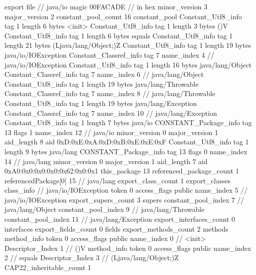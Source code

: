 export file {		// java/io
	magic	00FACADE		 // in hex
	minor_version	3
	major_version	2
	constant_pool_count	16
	constant_pool {
		Constant_Utf8_info {
			tag	1
			length	6
			bytes	<init>
		}
		Constant_Utf8_info {
			tag	1
			length	3
			bytes	()V
		}
		Constant_Utf8_info {
			tag	1
			length	6
			bytes	equals
		}
		Constant_Utf8_info {
			tag	1
			length	21
			bytes	(Ljava/lang/Object;)Z
		}
		Constant_Utf8_info {
			tag	1
			length	19
			bytes	java/io/IOException
		}
		Constant_Classref_info {
			tag	7
			name_index	4		// java/io/IOException
		}
		Constant_Utf8_info {
			tag	1
			length	16
			bytes	java/lang/Object
		}
		Constant_Classref_info {
			tag	7
			name_index	6		// java/lang/Object
		}
		Constant_Utf8_info {
			tag	1
			length	19
			bytes	java/lang/Throwable
		}
		Constant_Classref_info {
			tag	7
			name_index	8		// java/lang/Throwable
		}
		Constant_Utf8_info {
			tag	1
			length	19
			bytes	java/lang/Exception
		}
		Constant_Classref_info {
			tag	7
			name_index	10		// java/lang/Exception
		}
		Constant_Utf8_info {
			tag	1
			length	7
			bytes	java/io
		}
		CONSTANT_Package_info {
			tag	13
			flags	1
			name_index	12		// java/io
			minor_version	0
			major_version	1
			aid_length	8
			aid	0xD:0xE:0xA:0xD:0xB:0xE:0xE:0xF
		}
		Constant_Utf8_info {
			tag	1
			length	9
			bytes	java/lang
		}
		CONSTANT_Package_info {
			tag	13
			flags	0
			name_index	14		// java/lang
			minor_version	0
			major_version	1
			aid_length	7
			aid	0xA0:0x0:0x0:0x0:0x62:0x0:0x1
		}
	}
	this_package	13
	referenced_package_count	1
	referencedPackage[0]	15		// java/lang
	export_class_count	1
	export_classes {
		class_info {		// java/io/IOException
			token	0
			access_flags	public
			name_index	5		// java/io/IOException
			export_supers_count	3
			supers {
				constant_pool_index	7		// java/lang/Object
				constant_pool_index	9		// java/lang/Throwable
				constant_pool_index	11		// java/lang/Exception
			}
			export_interfaces_count	0
			interfaces {
			}
			export_fields_count	0
			fields {
			}
			export_methods_count	2
			methods {
				method_info {
					token	0
					access_flags	public
					name_index	0		// <init>
					Descriptor_Index	1		// ()V
				}
				method_info {
					token	0
					access_flags	public
					name_index	2		// equals
					Descriptor_Index	3		// (Ljava/lang/Object;)Z
				}
			}
			CAP22_inheritable_count	1
		}
	}
}
